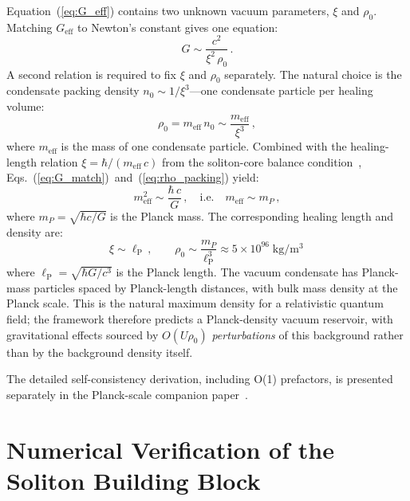 \documentclass[12pt, a4paper]{article}
\newcommand{\Geff}{G_{\mathrm{eff}}}
\newcommand{\lP}{\ell_{\mathrm{P}}}
\begin{document}
Equation~(\ref{eq:G_eff}) contains two unknown vacuum parameters, $\xi$ and $\rho_0$. Matching $\Geff$ to Newton's constant gives one equation:
\begin{equation}
    G \sim \frac{c^2}{\xi^2\,\rho_0}\,.
\label{eq:G_match}
\end{equation}
A second relation is required to fix $\xi$ and $\rho_0$ separately. The natural choice is the condensate packing density $n_0 \sim 1/\xi^3$---one condensate particle per healing volume:
\begin{equation}
    \rho_0 = m_{\mathrm{eff}}\,n_0 \sim \frac{m_{\mathrm{eff}}}{\xi^3}\,,
\label{eq:rho_packing}
\end{equation}
where $m_{\mathrm{eff}}$ is the mass of one condensate particle. Combined with the healing-length relation $\xi = \hbar/(m_{\mathrm{eff}}\,c)$ from the soliton-core balance condition~\cite{kulangiev_2026}, Eqs.~(\ref{eq:G_match})~and~(\ref{eq:rho_packing}) yield:
\begin{equation}
    m_{\mathrm{eff}}^2 \sim \frac{\hbar\,c}{G}\,,\quad\text{i.e.}\quad m_{\mathrm{eff}} \sim m_P\,,
\label{eq:meff_planck}
\end{equation}
where $m_P = \sqrt{\hbar c/G}$ is the Planck mass. The corresponding healing length and density are:
\begin{equation}
    \boxed{\;\xi \sim \lP\,,\qquad \rho_0 \sim \frac{m_P}{\lP^3} \approx 5 \times 10^{96}\;\mathrm{kg/m^3}\,\;}
\label{eq:planck_scale}
\end{equation}
where $\lP = \sqrt{\hbar G/c^3}$ is the Planck length. The vacuum condensate has Planck-mass particles spaced by Planck-length distances, with bulk mass density at the Planck scale. This is the natural maximum density for a relativistic quantum field; the framework therefore predicts a Planck-density vacuum reservoir, with gravitational effects sourced by $O(U \rho_0)$ \emph{perturbations} of this background rather than by the background density itself.

The detailed self-consistency derivation, including O(1) prefactors, is presented separately in the Planck-scale companion paper~\cite{kulangiev_2026e}.


\section{Numerical Verification of the Soliton Building Block}
\label{sec:numerics}
\end{document}

